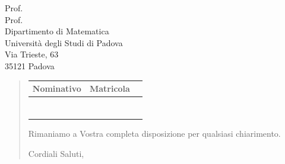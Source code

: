\documentclass[a4paper,12pt]{letteracdp}
\begin{document}
\begin{letter}{
	Prof. \Tullio{} \\
	Prof. \Riccardo{} \\
	Dipartimento di Matematica \\
	Università degli Studi di Padova \\
	Via Trieste, 63 \\
	35121 Padova}
\begin{quotation}
	
\renewcommand{\arraystretch}{1}
	\begin{table}
		\begin{center}
			\setlength{\aboverulesep}{0pt}
			\setlength{\belowrulesep}{0pt}
			\setlength{\extrarowheight}{.75ex}
			\begin{tabular}{ c c c }
				\rowcolor{AzzurroGruppo!30} 
				\textbf{Nominativo} & \textbf{Matricola}\\
				\toprule
				
				
		\Daniele{} & \DanieleM{} \\
		\Davide{} & \DavideM{} \\
		\Francesco{} & \FrancescoM{} \\
		\Giosue{} & \GiosueM{} \\
		\Lucrezia{} & \LucreziaM{} \\
		\Matteo{} & \MatteoM{} \\
		\Tommaso{} & \TommasoM{} \\	
				
				\bottomrule
			\end{tabular}
		\end{center}
	\end{table}
	
	Rimaniamo a Vostra completa disposizione per qualsiasi chiarimento.

\vspace{0.5cm}
\closing{ Cordiali Saluti,}

\end{quotation}

\end{letter}
\end{document}
